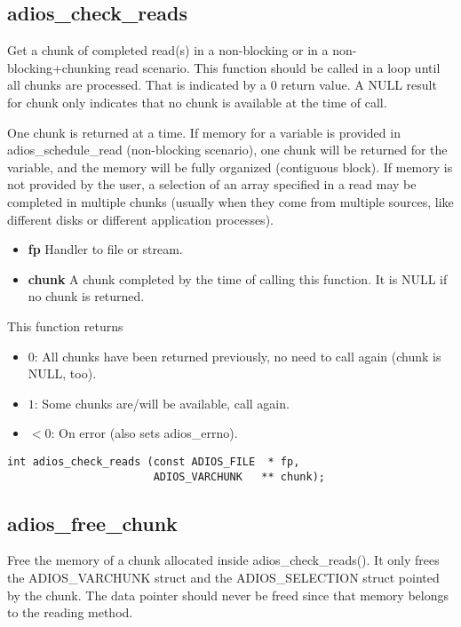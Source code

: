 \subsection{adios\_check\_reads}
Get a chunk of completed read(s) in a non-blocking or in a non-blocking+chunking read scenario.
This function should be called in a loop until all chunks are processed. 
That is indicated by a 0 return value. A NULL result for chunk only
indicates that no chunk is available at the time of call. 

One chunk is returned at a time. If memory for a variable is provided in adios\_schedule\_read 
(non-blocking scenario), one chunk will be returned for the variable, and the memory will be 
fully organized (contiguous block). If memory is not provided by the user,  a selection of an array 
specified in a read may be completed in multiple chunks (usually when they come from 
multiple sources, like different disks or different application processes). 

\begin{itemize}
\item{\bf fp} Handler to file or stream.
\item{\bf chunk} A chunk completed by the time of calling this function.
It is NULL if no chunk is returned.
\end{itemize}
This function returns 
\begin{itemize}
\item $0$: All chunks have been returned previously, 
                no need to call again (chunk is NULL, too).
\item $1$: Some chunks are/will be available, call again. 
\item $<0$: On error (also sets adios\_errno).
\end{itemize}

\begin{lstlisting}[alsolanguage=C]
int adios_check_reads (const ADIOS_FILE  * fp, 
                       ADIOS_VARCHUNK   ** chunk);
\end{lstlisting}

\subsection{adios\_free\_chunk}
Free the memory of a chunk allocated inside adios\_check\_reads().
It only frees the ADIOS\_VARCHUNK struct and the ADIOS\_SELECTION struct
pointed by the chunk. The data pointer should never be freed since
that memory belongs to the reading method.

